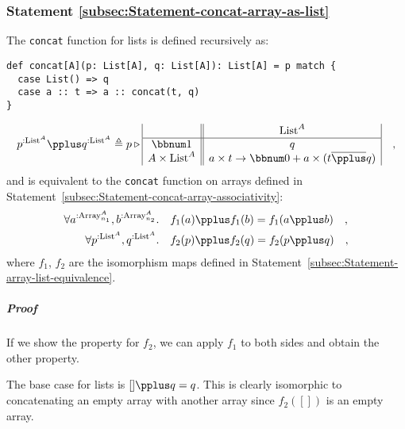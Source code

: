 \subsubsection{Statement \label{subsec:Statement-concat-array-as-list}\ref{subsec:Statement-concat-array-as-list}}

The \lstinline!concat! function for lists is defined recursively
as:
\begin{lstlisting}
def concat[A](p: List[A], q: List[A]): List[A] = p match {
  case List() => q
  case a :: t => a :: concat(t, q)
}
\end{lstlisting}
\[
p^{:\text{List}^{A}}\pplus q^{:\text{List}^{A}}\triangleq p\triangleright\begin{array}{|c||c|}
 & \text{List}^{A}\\
\hline \bbnum 1 & q\\
A\times\text{List}^{A} & a\times t\rightarrow\bbnum 0+a\times(t\overline{\pplus}q)
\end{array}\quad,
\]
and is equivalent to the \lstinline!concat! function on arrays defined
in Statement~\ref{subsec:Statement-concat-array-associativity}:
\begin{align*}
\forall a^{:\text{Array}_{n_{1}}^{A}},b^{:\text{Array}_{n_{2}}^{A}}.\quad & f_{1}(a)\pplus f_{1}(b)=f_{1}(a\pplus b)\quad,\\
\forall p^{:\text{List}^{A}},q^{:\text{List}^{A}}.\quad & f_{2}(p)\pplus f_{2}(q)=f_{2}(p\pplus q)\quad,
\end{align*}
where $f_{1}$, $f_{2}$ are the isomorphism maps defined in Statement~\ref{subsec:Statement-array-list-equivalence}.

\subparagraph{Proof}

If we show the property for $f_{2}$, we can apply $f_{1}$ to both
sides and obtain the other property.

The base case for lists is $[]\pplus q=q$. This is clearly isomorphic
to concatenating an empty array with another array since $f_{2}([])$
is an empty array. 

